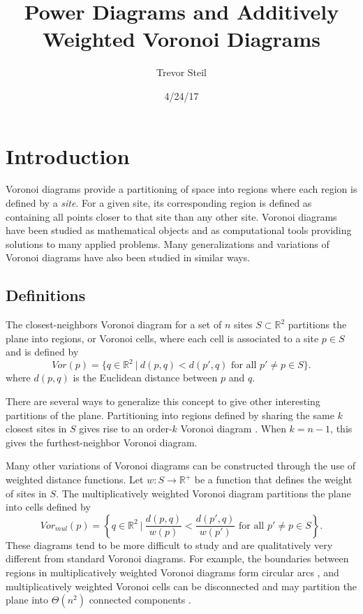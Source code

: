 \documentclass[a4paper, 11pt]{article}
\title{Power Diagrams and Additively Weighted Voronoi Diagrams }
\date{4/24/17}
\author{Trevor Steil}
\newcommand{\R}{\mathbb{R}}
\begin{document}
\maketitle

\section{Introduction}
Voronoi diagrams provide a partitioning of space into regions where each region is defined by a \textit{site}. For a given site, its corresponding
region is defined as containing all points closer to that site than any other site. Voronoi diagrams have been studied as mathematical objects and as
computational tools providing solutions to many applied problems. Many generalizations and variations of Voronoi diagrams have also been studied in
similar ways.

\subsection{Definitions}

The closest-neighbors Voronoi diagram for a set of $n$ sites $S \subset \R^2$ partitions the plane into regions, or Voronoi cells, where each cell is associated to a
site $p \in S$ and is defined by
\begin{equation*}
  Vor(p) = \{ q \in \R^2 \ | \ d(p,q) < d(p',q) \text{ for all } p' \neq p \in S \} .
\end{equation*}
where $d(p,q)$ is the Euclidean distance between $p$ and $q$.

There are several ways to generalize this concept to give other interesting partitions of the plane. Partitioning into regions defined by sharing the
same $k$ closest sites in $S$ gives rise to an order-$k$ Voronoi diagram \cite{aurenhammer_survey}. When $k=n-1$, this gives the furthest-neighbor
Voronoi diagram.

Many other variations of Voronoi diagrams can be constructed through the use of weighted distance functions. Let $w: S \to \R^+$ be a function that defines
the weight of sites in $S$. The multiplicatively weighted Voronoi diagram partitions the plane into cells defined by
\begin{equation*}
  Vor_{mul}(p) = \left\{ q \in \R^2 \ \bigg| \ \frac{d(p,q)}{w(p)} < \frac{d(p',q)}{w(p')} \text{ for all } p' \neq p \in S \right\}.
\end{equation*}
These diagrams tend to be more difficult to study and are qualitatively very different from standard Voronoi diagrams. For example,
the boundaries between regions in multiplicatively weighted Voronoi diagrams form circular arcs \cite{ash-bolker}, and multiplicatively weighted Voronoi
cells can be disconnected and may partition the plane into $\Theta(n^2)$ connected components \cite{aurenhammer_survey}.
\end{document}
